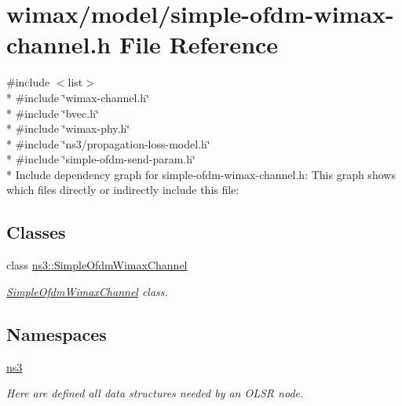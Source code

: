 \hypertarget{simple-ofdm-wimax-channel_8h}{}\section{wimax/model/simple-\/ofdm-\/wimax-\/channel.h File Reference}
\label{simple-ofdm-wimax-channel_8h}
{\ttfamily \#include $<$list$>$}\\*
{\ttfamily \#include \char`\"{}wimax-\/channel.\+h\char`\"{}}\\*
{\ttfamily \#include \char`\"{}bvec.\+h\char`\"{}}\\*
{\ttfamily \#include \char`\"{}wimax-\/phy.\+h\char`\"{}}\\*
{\ttfamily \#include \char`\"{}ns3/propagation-\/loss-\/model.\+h\char`\"{}}\\*
{\ttfamily \#include \char`\"{}simple-\/ofdm-\/send-\/param.\+h\char`\"{}}\\*
Include dependency graph for simple-\/ofdm-\/wimax-\/channel.h\+:
This graph shows which files directly or indirectly include this file\+:
\subsection*{Classes}
\begin{DoxyCompactItemize}
\item 
class \hyperlink{classns3_1_1SimpleOfdmWimaxChannel}{ns3\+::\+Simple\+Ofdm\+Wimax\+Channel}
\begin{DoxyCompactList}\small\item\em \hyperlink{classns3_1_1SimpleOfdmWimaxChannel}{Simple\+Ofdm\+Wimax\+Channel} class. \end{DoxyCompactList}\end{DoxyCompactItemize}
\subsection*{Namespaces}
\begin{DoxyCompactItemize}
\item 
 \hyperlink{namespacens3}{ns3}
\begin{DoxyCompactList}\small\item\em Here are defined all data structures needed by an O\+L\+SR node. \end{DoxyCompactList}\end{DoxyCompactItemize}
